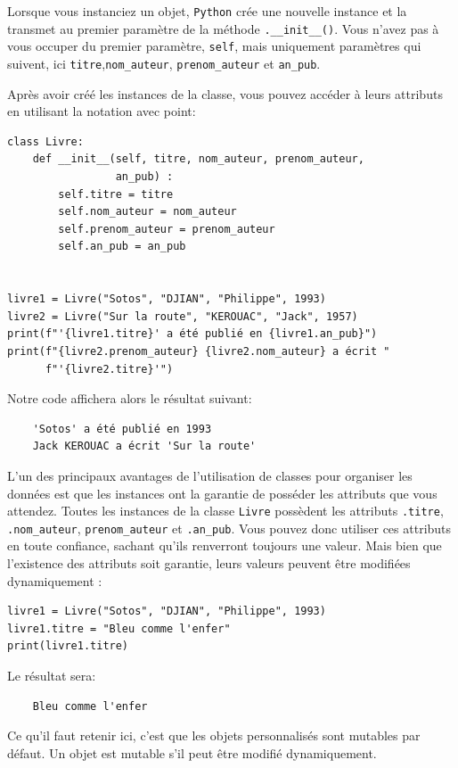 \documentclass[a4paper,12pt]{book}
\begin{document}
Lorsque vous instanciez un objet, \texttt{Python} crée une nouvelle instance et la transmet au premier paramètre de la méthode \texttt{.\_\_init\_\_()}. Vous n'avez pas à vous occuper du premier paramètre, \texttt{self}, mais uniquement paramètres qui suivent, ici \texttt{titre},\texttt{nom\_auteur}, \texttt{prenom\_auteur} et \texttt{an\_pub}.
\medskip

Après avoir créé les instances de la classe, vous pouvez accéder à leurs attributs en utilisant la notation avec point:
\begin{lstlisting}[caption=Accès aux atributs d'instance]
class Livre:
    def __init__(self, titre, nom_auteur, prenom_auteur, 
                 an_pub) :
		self.titre = titre
		self.nom_auteur = nom_auteur
		self.prenom_auteur = prenom_auteur
		self.an_pub = an_pub


livre1 = Livre("Sotos", "DJIAN", "Philippe", 1993)
livre2 = Livre("Sur la route", "KEROUAC", "Jack", 1957)
print(f"'{livre1.titre}' a été publié en {livre1.an_pub}")
print(f"{livre2.prenom_auteur} {livre2.nom_auteur} a écrit "
      f"'{livre2.titre}'")
\end{lstlisting}
\medskip

Notre code affichera alors le résultat suivant:
\begin{verbatim}
    'Sotos' a été publié en 1993
    Jack KEROUAC a écrit 'Sur la route'
\end{verbatim}
\medskip

L'un des principaux avantages de l'utilisation de classes pour organiser les données est que les instances ont la garantie de posséder les attributs que vous attendez. Toutes les instances de la classe \texttt{Livre} possèdent les attributs \texttt{.titre}, \texttt{.nom\_auteur}, \texttt{prenom\_auteur} et \texttt{.an\_pub}. Vous pouvez donc utiliser ces attributs en toute confiance, sachant qu'ils renverront toujours une valeur. Mais bien que l'existence des attributs soit garantie, leurs valeurs peuvent être modifiées dynamiquement :
\begin{lstlisting}[caption=Modification dynamique des attributs]
livre1 = Livre("Sotos", "DJIAN", "Philippe", 1993)
livre1.titre = "Bleu comme l'enfer"
print(livre1.titre)
\end{lstlisting}
\medskip

Le résultat sera:
\begin{verbatim}
    Bleu comme l'enfer
\end{verbatim}
\medskip

Ce qu'il faut retenir ici, c'est que les objets personnalisés sont mutables par défaut. Un objet est mutable s'il peut être modifié dynamiquement.
\medskip
\end{document}

